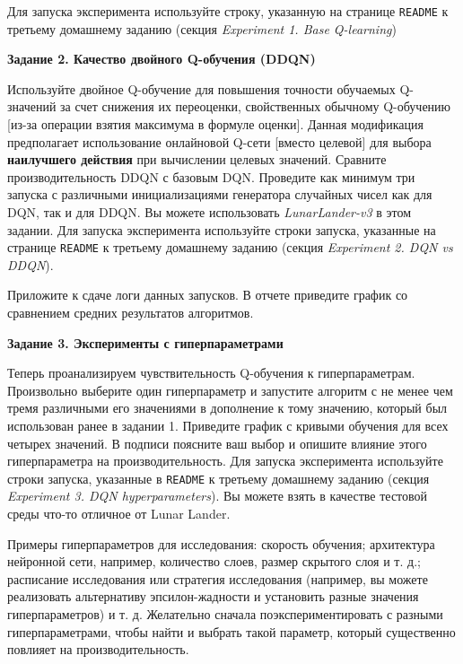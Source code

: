 \documentclass[12pt, oneside]{article}
\begin{document}
Для запуска эксперимента используйте строку, указанную на странице \verb|README| к третьему домашнему заданию (секция \textit{Experiment 1. Base Q-learning})

\textbf{Задание 2. Качество двойного Q-обучения (DDQN)}

Используйте двойное Q-обучение для повышения точности обучаемых Q-значений за счет снижения их переоценки, свойственных обычному Q-обучению [из-за операции взятия максимума в формуле оценки]. Данная модификация предполагает использование онлайновой Q-сети [вместо целевой] для выбора \textbf{наилучшего действия} при вычислении целевых значений. Сравните производительность DDQN с базовым DQN. Проведите как минимум три запуска с различными инициализациями генератора случайных чисел как для DQN, так и для DDQN. Вы можете использовать \textit{LunarLander-v3} в этом задании. Для запуска эксперимента используйте строки запуска, указанные на странице \verb|README| к третьему домашнему заданию (секция \textit{Experiment 2. DQN vs DDQN}).

Приложите к сдаче логи данных запусков. В отчете приведите график со сравнением средних результатов алгоритмов.

\textbf{Задание 3. Эксперименты с гиперпараметрами}

Теперь проанализируем чувствительность Q-обучения к гиперпараметрам. Произвольно выберите один гиперпараметр и запустите алгоритм с не менее чем тремя различными его значениями в дополнение к тому значению, который был использован ранее в задании 1. Приведите график с кривыми обучения для всех четырех значений. В подписи поясните ваш выбор и опишите влияние этого гиперпараметра на производительность. Для запуска эксперимента используйте строки запуска, указанные в \verb|README| к третьему домашнему заданию (секция \textit{Experiment 3. DQN hyperparameters}). Вы можете взять в качестве тестовой среды что-то отличное от Lunar Lander.

Примеры гиперпараметров для исследования: скорость обучения; архитектура нейронной сети, например, количество слоев, размер скрытого слоя и т. д.; расписание исследования или стратегия исследования (например, вы можете реализовать альтернативу эпсилон-жадности и установить разные значения гиперпараметров) и т. д. Желательно сначала поэкспериментировать с разными гиперпараметрами, чтобы найти и выбрать такой параметр, который существенно повлияет на производительность.
\end{document}

